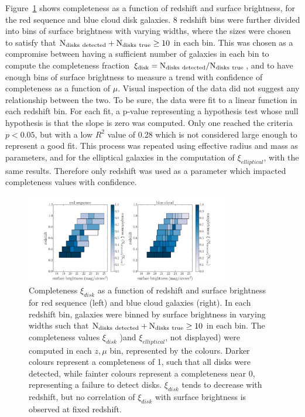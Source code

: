 \documentclass[useAMS,usenatbib]{mn2e}
\begin{document}
Figure~\ref{fig:xi_v_sb} shows completeness as a function of redshift and surface brightness, for the red sequence and blue cloud disk galaxies. 8 redshift bins were further divided into bins of surface brightness with varying widths, where the sizes were chosen to satisfy that $\rm N_{disks~detected} + N_{disks~true} \ge 10$ in each bin. This was chosen as a compromise between having a sufficient number of galaxies in each bin to compute the completeness fraction $\rm \xi_{disk} = N_{disks~detected}/N_{disks~true}$, and to have enough bins of surface brightness to measure a trend with confidence of completeness as a function of $\mu$. Visual inspection of the data did not suggest any relationship between the two. To be sure, the data were fit to a linear function in each redshift bin. For each fit, a p-value representing a hypothesis test whose null hypothesis is that the slope is zero was computed. Only one reached the criteria $p<0.05$, but with a low $R^{2}$ value of 0.28 which is not considered large enough to represent a good fit. This process was repeated using effective radius and mass as parameters, and for the elliptical galaxies in the computation of $\xi_{elliptical}$, with the same results. Therefore only redshift was used as a parameter which impacted completeness values with confidence. 

\begin{figure}
\centering
\includegraphics[width=3.5in,trim={3cm 0cm 3cm 0cm},clip]{figures/xi_v_sb.pdf}
\caption{Completeness $\xi_{disk}$ as a function of redshift and surface brightness for red sequence (left) and blue cloud galaxies (right). In each redshift bin, galaxies were binned by surface brightness in varying widths such that $\rm N_{disks~detected} + N_{disks~true} \ge 10$ in each bin. The completeness values $\xi_{disk}$ )and $\xi_{elliptical}$, not displayed) were computed in each $z,\mu$ bin, represented by the colours. Darker colours represent a completeness of 1, such that all disks were detected, while fainter colours represent a completeness near 0, representing a failure to detect disks. $\xi_{disk}$ tends to decrease with redshift, but no correlation of $\xi_{disk}$ with surface brightness is observed at fixed redshift.}
\label{fig:xi_v_sb}
\end{figure}
\end{document}
